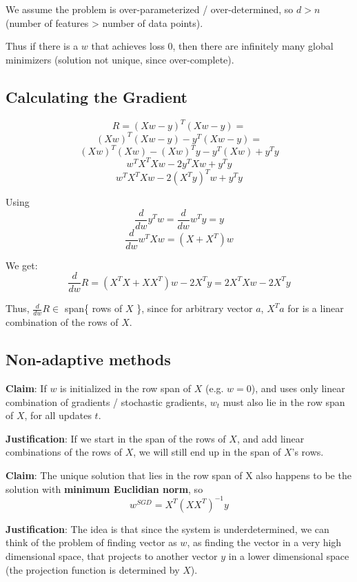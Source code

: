 \documentclass[12pt]{article}
\begin{document}
We assume the problem is over-parameterized / over-determined, so $d > n$ (number of features > number of data points).

Thus if there is a $w$ that achieves loss 0, then there are infinitely many global minimizers (solution not unique, since over-complete).

\subsection{Calculating the Gradient}
$$R = (Xw - y)^T (Xw - y) = $$
$$(Xw)^T(Xw-y) - y^T(Xw-y) = $$
$$(Xw)^T(Xw) - (Xw)^Ty - y^T(Xw) + y^Ty$$
$$w^TX^TXw - 2 y^TXw + y^Ty$$
$$w^TX^TXw - 2 (X^Ty)^Tw + y^Ty$$

\vspace{2mm}
Using
$$\frac{d}{dw} y^T w = \frac{d}{dw} w^T y = y$$
$$\frac{d}{dw} w^T X w = (X + X^T) w$$

\vspace{2mm}
We get:
$$\frac{d}{dw} R = (X^TX + XX^T) w - 2X^T y = 2 X^TX w - 2X^T y$$

Thus, $\frac{d}{dw} R \in $ span\{ rows of $X$ \}, since for arbitrary vector $a$, $X^T a$ for is a linear combination of the rows of $X$.

\newpage

\subsection{Non-adaptive methods}
\textbf{Claim}: If $w$ is initialized in the row span of $X$ (e.g. $w = 0$), and uses only linear combination of gradients / stochastic gradients, $w_t$ must also lie in the row span of $X$, for all updates $t$.

\textbf{Justification}: If we start in the span of the rows of $X$, and add linear combinations of the rows of $X$, we will still end up in the span of $X$'s rows.

\vspace{20mm}

\textbf{Claim}:  The unique solution that lies in the row span of X also happens to be the solution with \textbf{minimum Euclidian norm}, so
$$w^{SGD} = X^T (X X^T)^{-1} y$$

\textbf{Justification}: The idea is that since the system is underdetermined, we can think of the problem of finding vector as $w$, as finding the vector in a very high dimensional space, that projects to another vector $y$ in a lower dimensional space (the projection function is determined by $X$). 
\end{document}

